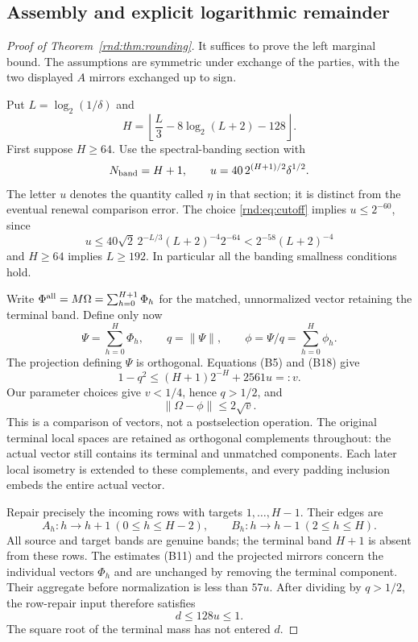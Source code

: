 \subsection{Assembly and explicit logarithmic remainder}\label{rnd:sec:assemble}
\begin{proof}[Proof of Theorem~\ref{rnd:thm:rounding}]
It suffices to prove the left marginal bound. The assumptions are symmetric under exchange of the parties, with the two displayed $A$ mirrors exchanged up to sign.

Put $L=\log_2(1/\delta)$ and
\begin{equation}\label{rnd:eq:cutoff}
 H=\left\lfloor\frac{L}{3}-8\log_2(L+2)-128\right\rfloor.
\end{equation}
First suppose $H\ge64$. Use the spectral-banding section with
\[
 N_{\rm band}=H+1,\qquad
 u=40\,2^{(H+1)/2}\delta^{1/2}.
\]
The letter $u$ denotes the quantity called $\eta$ in that section; it is distinct from the eventual renewal comparison error. The choice \eqref{rnd:eq:cutoff} implies $u\le2^{-60}$, since
\[
 u\le40\sqrt2\,2^{-L/3}(L+2)^{-4}2^{-64}<2^{-58}(L+2)^{-4}
\]
and $H\ge64$ implies $L\ge192$. In particular all the banding smallness conditions hold.

Write $\Phi^{\rm all}=M\Omega=\sum_{h=0}^{H+1}\Phi_h$ for the matched, unnormalized vector retaining the terminal band. Define only now
\[
 \Psi=\sum_{h=0}^{H}\Phi_h,\qquad q=\|\Psi\|,
 \qquad \phi=\Psi/q=\sum_{h=0}^{H}\phi_h.
\]
The projection defining $\Psi$ is orthogonal. Equations (B5) and (B18) give
\begin{equation}\label{rnd:eq:terminal}
 1-q^2\le (H+1)2^{-H}+2561u=:v.
\end{equation}
Our parameter choices give $v<1/4$, hence $q>1/2$, and
\begin{equation}\label{rnd:eq:state-close}
 \|\Omega-\phi\|\le2\sqrt v.
\end{equation}
This is a comparison of vectors, not a postselection operation. The original terminal local spaces are retained as orthogonal complements throughout: the actual vector still contains its terminal and unmatched components. Each later local isometry is extended to these complements, and every padding inclusion embeds the entire actual vector.

Repair precisely the incoming rows with targets $1,\ldots,H-1$. Their edges are
\[
 A_h:h\longrightarrow h+1\ (0\le h\le H-2),\qquad
 B_h:h\longrightarrow h-1\ (2\le h\le H).
\]
All source and target bands are genuine bands; the terminal band $H+1$ is absent from these rows. The estimates (B11) and the projected mirrors concern the individual vectors $\Phi_h$ and are unchanged by removing the terminal component. Their aggregate before normalization is less than $57u$. After dividing by $q>1/2$, the row-repair input therefore satisfies
\begin{equation}\label{rnd:eq:row-input}
 d\le128u\le1.
\end{equation}
The square root of the terminal mass has not entered $d$.


\end{proof}
